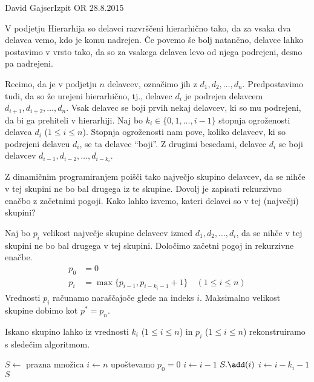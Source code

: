 \begin{naloga}{David Gajser}{Izpit OR 28.8.2015}
\begin{vprasanje}
V podjetju Hierarhija so delavci razvrščeni hierarhično tako,
da za vsaka dva delavca vemo, kdo je komu nadrejen.
Če povemo še bolj natančno, delavce lahko postavimo v vrsto tako,
da so za vsakega delavca levo od njega podrejeni, desno pa nadrejeni.

Recimo, da je v podjetju $n$ delavcev, označimo jih z $d_1, d_2, \dots, d_n$.
Predpostavimo tudi, da so že urejeni hierarhično,
tj., delavec $d_i$ je podrejen delavcem $d_{i+1}, d_{i+2}, \dots, d_n$.
Vsak delavec se boji prvih nekaj delavcev, ki so mu podrejeni,
da bi ga prehiteli v hierarhiji.
Naj bo $k_i \in \{0, 1, \dots, i-1\}$
stopnja ogroženosti delavca $d_i$ ($1 \le i \le n$).
Stopnja ogroženosti nam pove,
koliko delavcev, ki so podrejeni delavcu $d_i$, se ta delavec ``boji''.
Z drugimi besedami,
delavec $d_i$ se boji delavcev $d_{i-1}, d_{i-2}, \dots, d_{i-k_i}$.

Z dinamičnim programiranjem poišči tako največjo skupino delavcev,
da se nihče v tej skupini ne bo bal drugega iz te skupine.
Dovolj je zapisati rekurzivno enačbo z začetnimi pogoji.
Kako lahko izvemo, kateri delavci so v tej (največji) skupini?
\end{vprasanje}

\begin{odgovor}
Naj bo $p_i$ velikost največje skupine delavcev izmed $d_1, d_2, \dots, d_i$,
da se nihče v tej skupini ne bo bal drugega v tej skupini.
Določimo začetni pogoj in rekurzivne enačbe.
\begin{align*}
p_0 &= 0 \\
p_i &= \max\{p_{i-1}, p_{i-k_i-1} + 1\} \quad (1 \le i \le n)
\end{align*}
Vrednosti $p_i$ računamo naraščajoče glede na indeks $i$.
Maksimalno velikost skupine dobimo kot $p^* = p_n$.

Iskano skupino lahko iz vrednosti
$k_i$ ($1 \le i \le n$) in $p_i$ ($1 \le i \le n$)
re\-kon\-stru\-ira\-mo s sledečim algoritmom.
\begin{small}
\begin{algorithmic}
	\State $S \gets$ prazna množica
	\State $i \gets n$
		 \hfill upoštevamo $p_0 = 0$
			\State $i \gets i-1$
		\Else
			\State $S.\add(i)$
			\State $i \gets i-k_i-1$
		\EndIf
	\EndWhile
	\State \Return $S$
\EndFunction
\end{algorithmic}
\end{small}
\end{odgovor}
\end{naloga}
